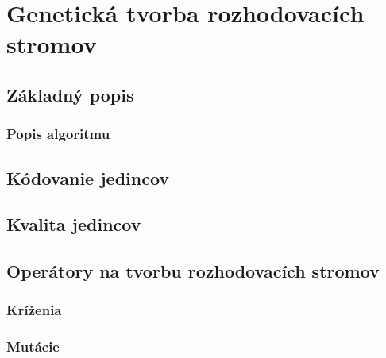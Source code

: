 \chapter{Genetická tvorba rozhodovacích stromov}

\section{Základný popis}

\subsection{Popis algoritmu}


\section{Kódovanie jedincov}

\section{Kvalita jedincov}

\section{Operátory na tvorbu rozhodovacích stromov}

\subsection{Kríženia}
\subsection{Mutácie}

